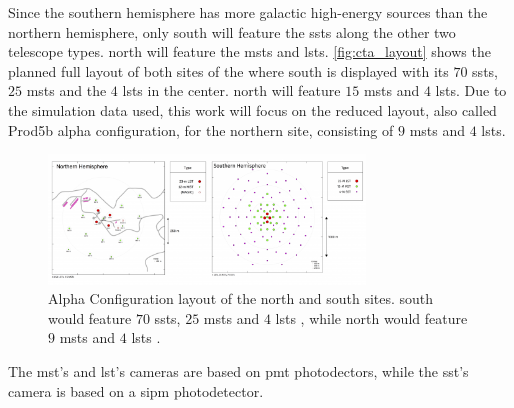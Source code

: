 Since the southern hemisphere has more galactic high-energy sources than the northern hemisphere,
only \cta{} south will feature the \glspl{sst} along the other two telescope types. \cta{} north
will feature the \glspl{mst} and \glspl{lst}. \autoref{fig:cta_layout} shows the
planned full layout of both sites of the \cta{} where \cta{} south is displayed with its \(\num{70}\)
\glspl{sst}, \(\num{25}\) \glspl{mst} and the \(\num{4}\) \glspl{lst} in the center. \cta{} north
will feature \(\num{15}\) \glspl{mst} and \(\num{4}\) \glspl{lst}. Due to the simulation data used,
this work will focus on the reduced layout, also called  Prod5b alpha
configuration, for the northern site, consisting of \(\num{9}\) \glspl{mst} and \(\num{4}\) \glspl{lst}.
\begin{figure}
    \centering
    \includegraphics[width=0.75\textwidth]{graphics/cta_layout.png}
    \caption{Alpha Configuration layout of the \cta{} north and south sites. \cta{} south would feature
    \(\num{70}\) \glspl{sst}, \(\num{25}\) \glspl{mst} and \(\num{4}\) \glspl{lst} \cite{cta_south_layout}, while
    \cta{} north would feature \(\num{9}\) \glspl{mst} and \(\num{4}\) \glspl{lst} \cite{cta_north_layout}.}
    \label{fig:cta_layout}
\end{figure}

The \gls{mst}'s and \gls{lst}'s cameras are based on \gls{pmt} photodectors, while the \gls{sst}'s
camera is based on a \gls{sipm} photodetector.
